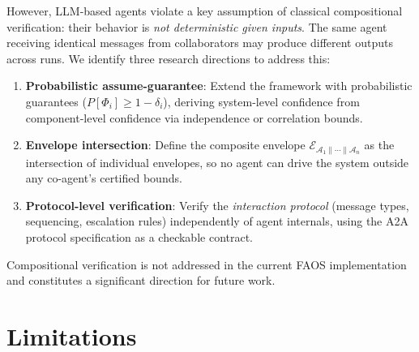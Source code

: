 \documentclass[11pt,a4paper]{article}
\newcommand{\faos}{\textsc{FAOS}}
\newcommand{\agent}{\mathcal{A}}
\newcommand{\env}{\mathcal{E}}
\begin{document}
However, LLM-based agents violate a key assumption of classical
compositional verification: their behavior is \emph{not deterministic
given inputs}. The same agent receiving identical messages from
collaborators may produce different outputs across runs. We identify
three research directions to address this:

\begin{enumerate}
  \item \textbf{Probabilistic assume-guarantee}: Extend the
    framework with probabilistic guarantees
    ($P[\Phi_i] \geq 1 - \delta_i$), deriving system-level
    confidence from component-level confidence via independence
    or correlation bounds.

  \item \textbf{Envelope intersection}: Define the composite
    envelope $\env_{\agent_1 \| \cdots \| \agent_n}$ as the
    intersection of individual envelopes, so no agent can drive
    the system outside any co-agent's certified bounds.

  \item \textbf{Protocol-level verification}: Verify the
    \emph{interaction protocol} (message types, sequencing,
    escalation rules) independently of agent internals, using
    the A2A protocol specification as a checkable contract.
\end{enumerate}

Compositional verification is not addressed in the current \faos{}
implementation and constitutes a significant direction for future work.

\section{Limitations}
\label{sec:limitations}
\end{document}
